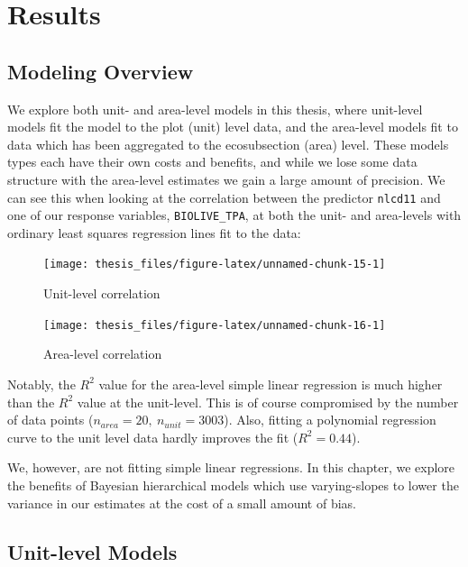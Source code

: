 \documentclass[12pt,twoside]{reedthesis}
\begin{document}
\hypertarget{results}{%
\chapter{Results}\label{results}}

\hypertarget{modeling-overview}{%
\section{Modeling Overview}\label{modeling-overview}}

We explore both unit- and area-level models in this thesis, where unit-level models fit the model to the plot (unit) level data, and the area-level models fit to data which has been aggregated to the ecosubsection (area) level. These models types each have their own costs and benefits, and while we lose some data structure with the area-level estimates we gain a large amount of precision. We can see this when looking at the correlation between the predictor \texttt{nlcd11} and one of our response variables, \texttt{BIOLIVE\_TPA}, at both the unit- and area-levels with ordinary least squares regression lines fit to the data:
\begin{figure}

{\centering \texttt{[image: thesis\_files/figure-latex/unnamed-chunk-15-1]} 

}

\caption{Unit-level correlation}\label{fig:unnamed-chunk-15}
\end{figure}
\begin{figure}

{\centering \texttt{[image: thesis\_files/figure-latex/unnamed-chunk-16-1]} 

}

\caption{Area-level correlation}\label{fig:unnamed-chunk-16}
\end{figure}
Notably, the \(R^2\) value for the area-level simple linear regression is much higher than the \(R^2\) value at the unit-level. This is of course compromised by the number of data points (\(n_{area} = 20, ~ n_{unit} = 3003\)). Also, fitting a polynomial regression curve to the unit level data hardly improves the fit (\(R^2 = 0.44\)).

We, however, are not fitting simple linear regressions. In this chapter, we explore the benefits of Bayesian hierarchical models which use varying-slopes to lower the variance in our estimates at the cost of a small amount of bias.

\hypertarget{unit-level-models}{%
\section{Unit-level Models}\label{unit-level-models}}
\end{document}
